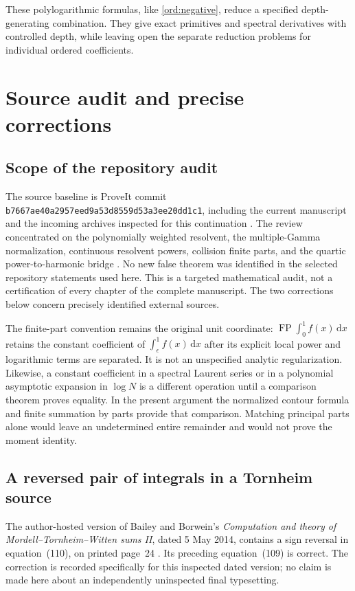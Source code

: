 \documentclass[11pt,a4paper]{article}
\numberwithin{equation}{section}
\theoremstyle{definition}
\theoremstyle{remark}
\DeclareMathOperator{\FP}{FP}
\newcommand{\dd}{\mathrm d}
\begin{document}
These polylogarithmic formulas, like \eqref{ord:negative}, reduce a
specified depth-generating combination.  They give exact primitives
and spectral derivatives with controlled depth, while leaving open
the separate reduction problems for individual ordered coefficients.

\section{Source audit and precise corrections}
\label{powers:sec:audit}

\subsection{Scope of the repository audit}

The source baseline is ProveIt commit
\texttt{b7667ae40a2957eed9a53d8559d53a3ee20dd1c1}, including the
current manuscript and the incoming archives inspected for this
continuation \cite{Repo}. The review concentrated on the polynomially
weighted resolvent, the multiple-Gamma normalization, continuous
resolvent powers, collision finite parts, and the quartic
power-to-harmonic bridge \cite{Quartic,Barnes}. No new false theorem
was identified in the selected repository statements used here.
This is a targeted mathematical audit, not a certification of every
chapter of the complete manuscript. The two corrections below concern
precisely identified external sources.

The finite-part convention remains the original unit coordinate:
\(\FP\int_0^1 f(x)\,\dd x\) retains the constant coefficient of
\(\int_\epsilon^1 f(x)\,\dd x\) after its explicit local power and
logarithmic terms are separated. It is not an unspecified analytic
regularization. Likewise, a constant coefficient in a spectral Laurent
series or in a polynomial asymptotic expansion in \(\log N\) is a
different operation until a comparison theorem proves equality. In the
present argument the normalized contour formula and finite summation
by parts provide that comparison. Matching principal parts alone would
leave an undetermined entire remainder and would not prove the moment
identity.

\subsection{A reversed pair of integrals in a Tornheim source}

The author-hosted version of Bailey and Borwein's
\emph{Computation and theory of Mordell--Tornheim--Witten sums II},
dated 5 May 2014, contains a sign reversal in equation~(110), on printed
page~24 \cite{BB2014}. Its preceding equation~(109) is correct. The
correction is recorded specifically for this inspected dated version;
no claim is made here about an independently uninspected final
typesetting.
\end{document}
